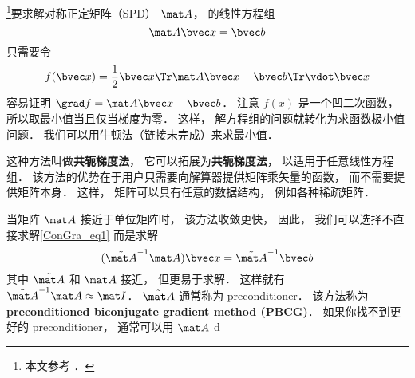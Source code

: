 

\footnote{本文参考 \cite{NR3}．}要求解对称正定矩阵（SPD） $\mat A$， 的线性方程组
\begin{equation}\label{ConGra_eq1}
\mat A \bvec x = \bvec b
\end{equation}
只需要令
\begin{equation}
f(\bvec x) = \frac{1}{2}\bvec x\Tr \mat A\bvec x - \bvec b\Tr \vdot \bvec x
\end{equation}
容易证明 $\grad f = \mat A \bvec x - \bvec b$． 注意 $f(x)$ 是一个凹二次函数， 所以取最小值当且仅当梯度为零． 这样， 解方程组的问题就转化为求函数极小值问题． 我们可以用牛顿法（链接未完成）来求最小值．

这种方法叫做\textbf{共轭梯度法}， 它可以拓展为\textbf{共轭梯度法}， 以适用于任意线性方程组． 该方法的优势在于用户只需要向解算器提供矩阵乘矢量的函数， 而不需要提供矩阵本身． 这样， 矩阵可以具有任意的数据结构， 例如各种稀疏矩阵．

当矩阵 $\mat A$ 接近于单位矩阵时， 该方法收敛更快， 因此， 我们可以选择不直接求解\autoref{ConGra_eq1} 而是求解
\begin{equation}
(\tilde {\mat A}^{-1}\mat A) \bvec x = \tilde {\mat A}^{-1}\bvec b
\end{equation}
其中 $\tilde {\mat A}$ 和 $\mat A$ 接近， 但更易于求解． 这样就有 $\tilde {\mat A}^{-1}\mat A \approx \mat I$． $\tilde {\mat A}$ 通常称为 preconditioner． 该方法称为 \textbf{preconditioned biconjugate gradient method (PBCG)}． 如果你找不到更好的 preconditioner， 通常可以用 $\mat A$ d

